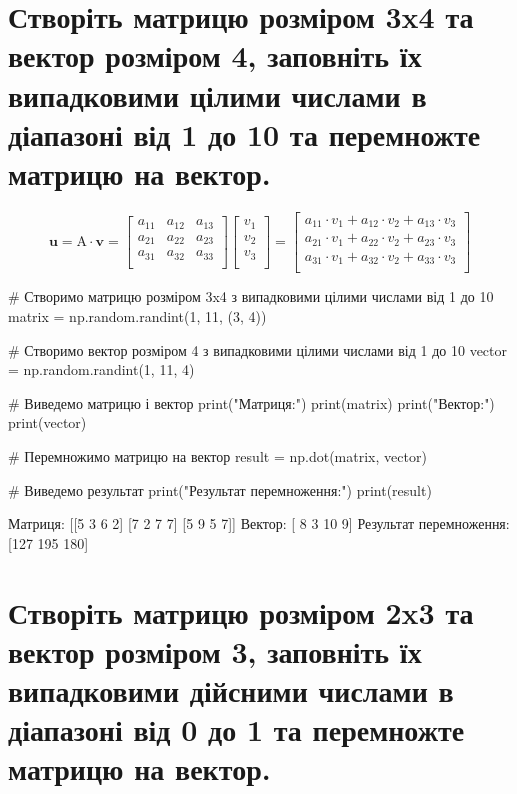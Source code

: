 \documentclass[]{article}
\newcounter{pythoncode}
\begin{document}
\section{Створіть матрицю розміром 3x4 та вектор розміром 4, заповніть їх випадковими цілими числами в діапазоні від 1 до 10 та перемножте матрицю на вектор.}
\[
	\mathbf{u} = \mathrm{A} \cdot \mathbf{v} =
	\begin{bmatrix}
		a_{11} & a_{12} & a_{13} \\
		a_{21} & a_{22} & a_{23} \\
		a_{31} & a_{32} & a_{33} \\
	\end{bmatrix}
	\begin{bmatrix}
		v_1 \\
		v_2 \\
		v_3 \\
	\end{bmatrix}
	=
	\begin{bmatrix}
		a_{11} \cdot v_1 + a_{12} \cdot v_2 + a_{13} \cdot v_3 \\
		a_{21} \cdot v_1 + a_{22} \cdot v_2 + a_{23} \cdot v_3 \\
		a_{31} \cdot v_1 + a_{32} \cdot v_2 + a_{33} \cdot v_3 \\
	\end{bmatrix}
\]

\begin{pythoncode}
    # Створимо матрицю розміром 3x4 з випадковими цілими числами від 1 до 10
    matrix = np.random.randint(1, 11, (3, 4))

    # Створимо вектор розміром 4 з випадковими цілими числами від 1 до 10
    vector = np.random.randint(1, 11, 4)

    # Виведемо матрицю і вектор
    print("Матриця:")
    print(matrix)
    print("Вектор:")
    print(vector)

    # Перемножимо матрицю на вектор
    result = np.dot(matrix, vector)

    # Виведемо результат
    print("Результат перемноження:")
    print(result)
\end{pythoncode}

\begin{out}
	Матриця:
	[[5 3 6 2]
	 [7 2 7 7]
	 [5 9 5 7]]
	Вектор:
	[ 8  3 10  9]
	Результат перемноження:
	[127 195 180]
\end{out}

\section{Створіть матрицю розміром 2x3 та вектор розміром 3, заповніть їх випадковими дійсними числами в діапазоні від 0 до 1 та перемножте матрицю на вектор.}
\end{document}
